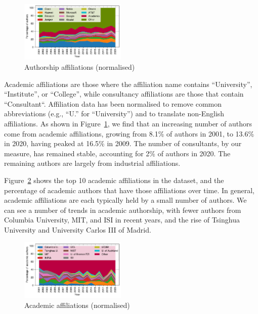 \documentclass[twocolumn,10pt]{article}
\newcommand{\pb}[1]{\vspace{0.75ex}\noindent{\textbf{#1}}}
\begin{document}
\begin{figure}
\includegraphics[width=0.45\textwidth]{figures-prev/imc-2021/authors/top5_affiliations_normalised.pdf}
\caption{Authorship affiliations (normalised)}
\label{fig:author_affiliations_normalised}
\end{figure}

\pb{Academia and consultants:}
Academic affiliations are those where the affiliation name contains
``University'', ``Institute'', or ``College'', while consultancy
affiliations are those that contain ``Consultant``. Affiliation data has
been normalised to remove common abbreviations (e.g., ``U.'' for
``University'') and to translate non-English affiliations.  As shown in
Figure~\ref{fig:author_affiliations_normalised}, we find that an increasing
number of authors come from academic affiliations, growing from 8.1\% of
authors in 2001, to 13.6\% in 2020, having peaked at 16.5\% in 2009. The
number of consultants, by our measure, has remained stable, accounting for
2\% of authors in 2020.  The remaining authors are largely from industrial
affiliations.

Figure~\ref{fig:author_affiliations_normalised_acad} shows the top 10
academic affiliations in the dataset, and the percentage of academic
authors that have those affiliations over time. In general, academic
affiliations are each typically held by a small number of authors. We can
see a number of trends in academic authorship, with fewer authors from
Columbia University, MIT, and ISI in recent years, and the rise of Tsinghua
University and University Carlos III of Madrid.

\begin{figure}
\includegraphics[width=0.45\textwidth]{figures-prev/imc-2021/authors/top5_affiliations_normalised_acad.pdf}
\caption{Academic affiliations (normalised)}
\label{fig:author_affiliations_normalised_acad}
\end{figure}
\end{document}
